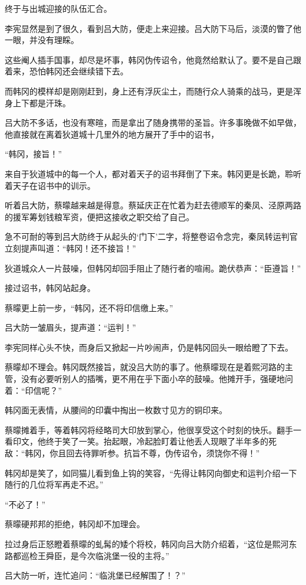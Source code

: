 终于与出城迎接的队伍汇合。

李宪显然是到了很久，看到吕大防，便走上来迎接。吕大防下马后，淡漠的瞥了他一眼，并没有理睬。

这些阉人插手国事，却尽是坏事，韩冈伪传诏令，他竟然给默认了。要不是自己跟着来，恐怕韩冈还会继续错下去。

而韩冈的模样却是刚刚赶到，身上还有浮灰尘土，而随行众人骑乘的战马，更是浑身上下都是汗珠。

吕大防不多话，也没有寒暄，而是拿出了随身携带的圣旨。许多事晚做不如早做，他直接就在离着狄道城十几里外的地方展开了手中的诏书，

“韩冈，接旨！”

来自于狄道城中的每一个人，都对着天子的诏书拜倒了下来。韩冈更是长跪，聆听着天子在诏书中的训示。

听着吕大防，蔡曚越来越是得意。蔡延庆正在忙着为赶去德顺军的秦凤、泾原两路的援军筹划钱粮军资，便把这接收之职交给了自己。

急不可耐的等到吕大防终于从起头的‘门下’二字，将整卷诏令念完，秦凤转运判官立刻提声叫道：“韩冈！还不接旨！”

狄道城众人一片鼓噪，但韩冈却回手阻止了随行者的喧闹。跪伏恭声：“臣遵旨！”

接过诏书，韩冈站起身。

蔡曚更上前一步，“韩冈，还不将印信缴上来。”

吕大防一皱眉头，提声道：“运判！”

李宪同样心头不快，而身后又掀起一片吵闹声，仍是韩冈回头一眼给瞪了下去。

蔡曚却不理会。韩冈既然接旨，就没吕大防的事了。他蔡曚现在是着熙河路的主管，没有必要听别人的插嘴，更不用在乎下面小卒的鼓噪。他摊开手，强硬地问着：“印信呢？”

韩冈面无表情，从腰间的印囊中掏出一枚数寸见方的铜印来。

蔡曚摊着手，等着韩冈将经略司大印放到掌心，他很享受这个时刻的快乐。翻手一看印文，他终于笑了一笑。抬起眼，冷起脸盯着让他丢人现眼了半年多的死敌：“韩冈，你且回去待罪听参。抗旨不尊，伪传诏令，须饶你不得！”

韩冈却是笑了，如同猫儿看到鱼上钩的笑容，“先得让韩冈向御史和运判介绍一下随行的几位将军再走不迟。”

“不必了！”

蔡曚硬邦邦的拒绝，韩冈却不加理会。

拉过身后正怒瞪着蔡曚的虬髯的矮个将校，韩冈向吕大防介绍着，“这位是熙河东路都巡检王舜臣，是今次临洮堡一役的主将。”

吕大防一听，连忙追问：“临洮堡已经解围了！？”

